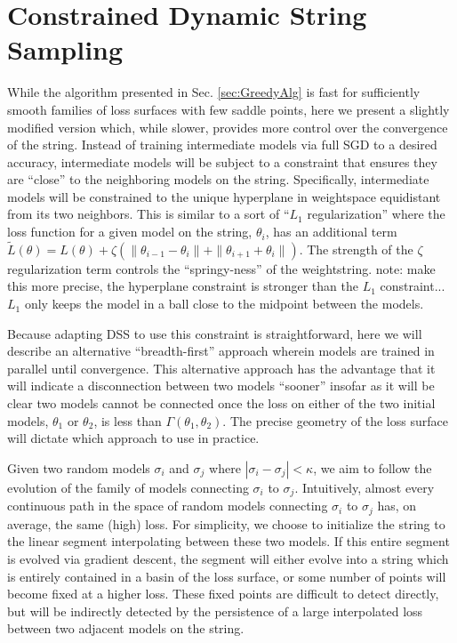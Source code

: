 \section{Constrained Dynamic String Sampling}
  \label{sec:ConstrainedAlg}
  
  While the algorithm presented in Sec. \ref{sec:GreedyAlg} is fast for sufficiently smooth families of loss surfaces with few saddle points, here we present a slightly modified version which, while slower, provides more control over the convergence of the string.  Instead of training intermediate models via full SGD to a desired accuracy, intermediate models will be subject to a constraint that ensures they are ``close'' to the neighboring models on the string.  Specifically, intermediate models will be constrained to the unique hyperplane in weightspace equidistant from its two neighbors.  This is similar to a sort of ``$L_1$ regularization'' where the loss function for a given model on the string, $\theta_i$, has an additional term $\tilde{L}(\theta) = L(\theta)+\zeta(\|\theta_{i-1} - \theta_i\|+\|\theta_{i+1} + \theta_i\|)$.  The strength of the $\zeta$ regularization term controls the ``springy-ness'' of the weightstring. note: make this more precise, the hyperplane constraint is stronger than the $L_1$ constraint...$L_1$ only keeps the model in a ball close to the midpoint between the models.
  
  Because adapting DSS to use this constraint is straightforward, here we will describe an alternative ``breadth-first'' approach wherein models are trained in parallel until convergence.  This alternative approach has the advantage that it will indicate a disconnection between two models ``sooner'' insofar as it will be clear two models cannot be connected once the loss on either of the two initial models, $\theta_1$ or $\theta_2$, is less than $\Gamma(\theta_1, \theta_2)$.  The precise geometry of the loss surface will dictate which approach to use in practice.
  
  Given two random models $\sigma_i$ and $\sigma_j$ where $|\sigma_i - \sigma_j| < \kappa$, we aim to follow the evolution of the family of models connecting $\sigma_i$ to $\sigma_j$.  Intuitively, almost every continuous path in the space of random models connecting $\sigma_i$ to $\sigma_j$ has, on average, the same (high) loss.  For simplicity, we choose to initialize the string to the linear segment interpolating between these two models.  If this entire segment is evolved via gradient descent, the segment will either evolve into a string which is entirely contained in a basin of the loss surface, or some number of points will become fixed at a higher loss.  These fixed points are difficult to detect directly, but will be indirectly detected by the persistence of a large interpolated loss between two adjacent models on the string.
  
